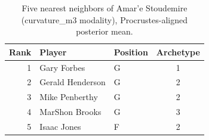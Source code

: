 \begin{table}[htbp]
  \centering\small
  \begin{tabular}{rllc}
    \toprule
    Rank & Player & Position & Archetype \\
    \midrule
    1 & Gary Forbes & G & 1 \\
    2 & Gerald Henderson & G & 2 \\
    3 & Mike Penberthy & G & 2 \\
    4 & MarShon Brooks & G & 3 \\
    5 & Isaac Jones & F & 2 \\
    \bottomrule
  \end{tabular}
  \caption{Five nearest neighbors of Amar'e Stoudemire (curvature_m3 modality), Procrustes-aligned posterior mean.}
  \label{tab:Amar_e_Stoudemire_neighbors_curvature_m3}
\end{table}

